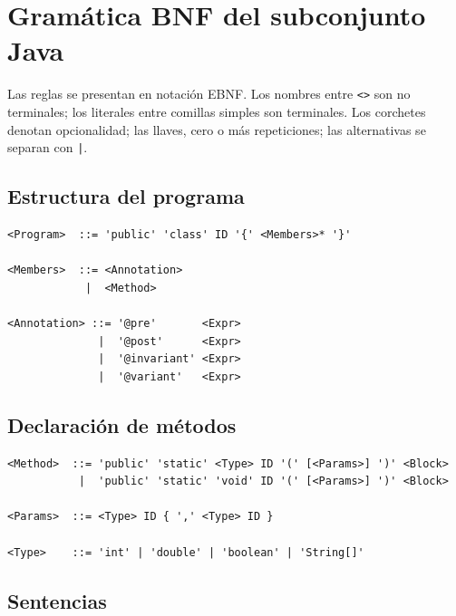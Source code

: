 \chapter{Gramática BNF del subconjunto Java}
\label{apend:gramatica}

Las reglas se presentan en notación EBNF. Los nombres entre
\texttt{<>} son no terminales; los literales entre comillas simples
son terminales. Los corchetes denotan opcionalidad; las llaves,
cero o más repeticiones; las alternativas se separan con \texttt{|}.

\section{Estructura del programa}

\begin{lstlisting}[style=pseudo, caption={Producción raíz}]
<Program>  ::= 'public' 'class' ID '{' <Members>* '}'

<Members>  ::= <Annotation>
            |  <Method>

<Annotation> ::= '@pre'       <Expr>
              |  '@post'      <Expr>
              |  '@invariant' <Expr>
              |  '@variant'   <Expr>
\end{lstlisting}

\section{Declaración de métodos}

\begin{lstlisting}[style=pseudo, caption={Métodos y parámetros}]
<Method>  ::= 'public' 'static' <Type> ID '(' [<Params>] ')' <Block>
           |  'public' 'static' 'void' ID '(' [<Params>] ')' <Block>

<Params>  ::= <Type> ID { ',' <Type> ID }

<Type>    ::= 'int' | 'double' | 'boolean' | 'String[]'
\end{lstlisting}

\section{Sentencias}

